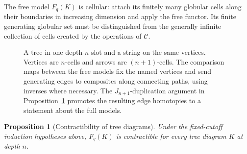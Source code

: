 \documentclass[11pt,letterpaper]{article}
\numberwithin{equation}{section}
\theoremstyle{plain}
\newtheorem{proposition}[theorem]{Proposition}
\theoremstyle{definition}
\theoremstyle{remark}
\begin{document}
The free model $F_q(K)$ is cellular: attach its finitely many
globular cells along their boundaries in increasing dimension and
apply the free functor.  Its finite generating globular set must
be distinguished from the generally infinite collection of cells
created by the operations of $\mathcal C$.

\begin{figure}
\centering
{}
\caption{A tree in one depth-\(n\) slot and a string on the same vertices.
Vertices are \(n\)-cells and arrows are
\((n+1)\)-cells.  The comparison maps between the free models fix the
named vertices and send generating edges to composites along connecting
paths, using inverses where necessary.  The \(J_{n+1}\)-duplication
argument in Proposition~\ref{prop:tree-contractible} promotes the
resulting edge homotopies to a statement about the full models.}
\label{fig:tree-string}
\end{figure}


\begin{proposition}[Contractibility of tree diagrams]
\label{prop:tree-contractible}
Under the fixed-cutoff induction hypotheses above, $F_q(K)$ is
contractible for every tree diagram $K$ at depth $n$.
\end{proposition}
\end{document}
